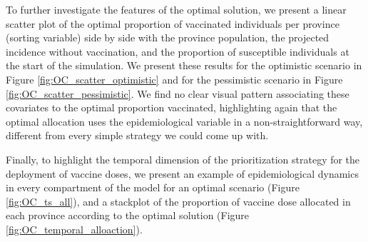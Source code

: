 To further investigate the features of the optimal solution, we present a linear scatter plot of the optimal proportion of vaccinated individuals per province (sorting variable) side by side with the province population, the projected incidence without vaccination, and the proportion of susceptible individuals at the start of the simulation. We present these results for the optimistic scenario in Figure \ref{fig:OC_scatter_optimistic} and for the pessimistic scenario in Figure \ref{fig:OC_scatter_pessimistic}. We find no clear visual pattern associating these covariates to the optimal proportion vaccinated, highlighting again that the optimal allocation uses the epidemiological variable in a non-straightforward way, different from every simple strategy we could come up with.

Finally, to highlight the temporal dimension of the prioritization strategy for the deployment of vaccine doses, we present an example of epidemiological dynamics in every compartment of the model for an optimal scenario (Figure \ref{fig:OC_ts_all}), and a stackplot of the proportion of vaccine dose allocated in each province according to the optimal solution (Figure \ref{fig:OC_temporal_alloaction}).

